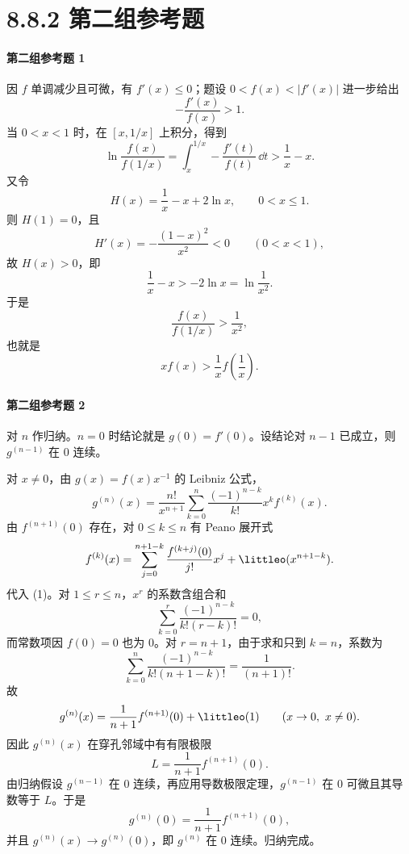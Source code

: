 \section*{8.8.2 第二组参考题}

\paragraph{第二组参考题 1}
\begin{xsolution}
因 $f$ 单调减少且可微，有 $f'(x)\le0$；题设 $0<f(x)<|f'(x)|$ 进一步给出
\[
  -\frac{f'(x)}{f(x)}>1.
\]
当 $0<x<1$ 时，在 $[x,1/x]$ 上积分，得到
\[
  \ln\frac{f(x)}{f(1/x)}
  =\int_x^{1/x}-\frac{f'(t)}{f(t)}\,\dd t
  >\frac1x-x.
\]
又令
\[
  H(x)=\frac1x-x+2\ln x,
  \qquad 0<x\le1.
\]
则 $H(1)=0$，且
\[
  H'(x)=-\frac{(1-x)^2}{x^2}<0\qquad(0<x<1),
\]
故 $H(x)>0$，即
\[
  \frac1x-x>-2\ln x=\ln\frac1{x^2}.
\]
于是
\[
  \frac{f(x)}{f(1/x)}>\frac1{x^2},
\]
也就是
\[
  \boxed{x f(x)>\frac1x f\left(\frac1x\right)}.
\]
\end{xsolution}

\paragraph{第二组参考题 2}
\begin{xsolution}
对 $n$ 作归纳。$n=0$ 时结论就是 $g(0)=f'(0)$。设结论对 $n-1$ 已成立，则 $g^{(n-1)}$ 在 $0$ 连续。

对 $x\ne0$，由 $g(x)=f(x)x^{-1}$ 的 Leibniz 公式，
\[
  g^{(n)}(x)
  =\frac{n!}{x^{n+1}}
   \sum_{k=0}^n\frac{(-1)^{n-k}}{k!}x^k f^{(k)}(x).
\tag{1}
\]
由 $f^{(n+1)}(0)$ 存在，对 $0\le k\le n$ 有 Peano 展开式
\[
  f^{(k)}(x)
  =\sum_{j=0}^{n+1-k}
    \frac{f^{(k+j)}(0)}{j!}x^j
   +\littleo(x^{n+1-k}).
\]
代入 (1)。对 $1\le r\le n$，$x^r$ 的系数含组合和
\[
  \sum_{k=0}^r\frac{(-1)^{n-k}}{k!(r-k)!}=0,
\]
而常数项因 $f(0)=0$ 也为 0。对 $r=n+1$，由于求和只到 $k=n$，系数为
\[
  \sum_{k=0}^n\frac{(-1)^{n-k}}{k!(n+1-k)!}
  =\frac1{(n+1)!}.
\]
故
\[
  g^{(n)}(x)
  =\frac1{n+1}f^{(n+1)}(0)+\littleo(1)
  \qquad(x\to0,\ x\ne0).
\]
因此 $g^{(n)}(x)$ 在穿孔邻域中有有限极限
\[
  L=\frac1{n+1}f^{(n+1)}(0).
\]
由归纳假设 $g^{(n-1)}$ 在 $0$ 连续，再应用导数极限定理，$g^{(n-1)}$ 在 $0$ 可微且其导数等于 $L$。于是
\[
  \boxed{g^{(n)}(0)=\frac1{n+1}f^{(n+1)}(0)},
\]
并且 $g^{(n)}(x)\to g^{(n)}(0)$，即 $g^{(n)}$ 在 $0$ 连续。归纳完成。
\end{xsolution}

